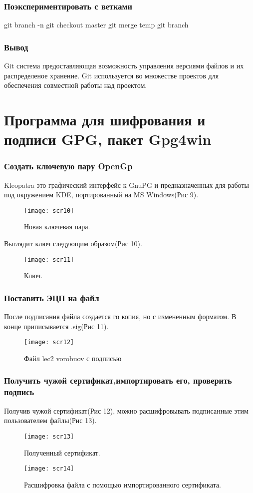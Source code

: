 \documentclass[a4paper,12pt]{article}
\begin{document}
\section[9]{Поэкспериментировать с ветками}

\begin{verbatim*}
git branch -n
git checkout master
git merge temp
git branch
\end{verbatim*}

\section[10]{Вывод}
Git система предоставляющая возможность управления версиями файлов и  их распределеное хранение. Git используется во множестве проектов для обеспечения совместной работы над проектом. 

\part[3]{Программа для шифрования и подписи GPG, пакет Gpg4win}

\section[1]{Создать ключевую пару OpenGp}

Kleopatra это графический интерфейс к GnuPG и предназначенных для работы под окружением KDE, портированный на MS Windows(Рис 9).
\begin{figure}
	\center
	\texttt{[image: scr10]}
	\caption{Новая ключевая пара.}
\end{figure}
Выглядит ключ следующим образом(Рис 10).
\begin{figure}
	\center
	\texttt{[image: scr11]}
	\caption{Ключ.}
\end{figure}

\section[2]{Поставить ЭЦП на файл}
После подписания файла создается го копия, но с измененным форматом. В конце приписывается .sig(Рис 11).
\begin{figure}
	\center
	\texttt{[image: scr12]}
	\caption{Файл lec2 vorobuov с подписью}
\end{figure}

\section[3]{Получить чужой сертификат,импортировать его, проверить подпись}
Получив чужой сертификат(Рис 12), можно расшифровывать подписанные этим пользователем файлы(Рис 13).
\begin{figure}
	\center
	\texttt{[image: scr13]}
	\caption{Полученный сертификат.}
\end{figure}
\begin{figure}
	\center
	\texttt{[image: scr14]}
	\caption{Расшифровка файла с помощью импортированного сертификата.}
\end{figure}
\end{document}
